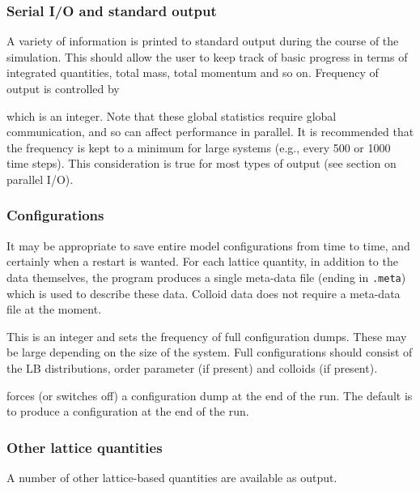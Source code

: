\subsubsection{Serial I/O and standard output}

A variety of information is printed to standard output during the
course of the simulation. This should allow the user to keep track
of basic progress in terms of integrated quantities, total mass,
total momentum and so on. Frequency of output is controlled by


which is an integer. Note that these global statistics require
global communication, and so can affect performance in parallel.
It is recommended that the frequency is kept to a minimum for
large systems (e.g., every 500 or 1000 time steps). This
consideration is true for most types of output (see section
on parallel I/O).

\subsubsection{Configurations}

It may be appropriate to save entire model configurations from
time to time, and certainly when a restart is wanted. For each lattice
quantity, in addition to the data themselves, the program produces a
single meta-data file (ending in
\texttt{.meta}) which is used to describe these data. Colloid
data does not require a meta-data file at the moment.


This is an integer and sets the frequency of full configuration dumps.
These may be large depending on the size of the system.
Full configurations should consist of the LB distributions,
order parameter (if present) and colloids (if present).



forces (or switches off) a configuration dump at the end of the run.
The default is to produce a configuration at the end of the run.

\subsubsection{Other lattice quantities}

A number of other lattice-based quantities are available as output.


